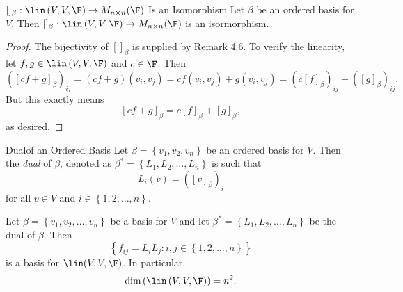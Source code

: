 \documentclass[math_245.tex]{subfiles}
\begin{document}
    \begin{theorem}{$[]_\beta:\lin\left( V,V,\F \right)\to M_{n\times n}(\F)$ Is an Isomorphism}
        Let $\beta$ be an ordered basis for $V$. Then $[]_\beta:\lin\left( V,V,\F \right)\to M_{n\times n}(\F)$ is an isormorphism.
    \end{theorem}

    \begin{proof}
        The bijectivity of $[]_\beta$ is supplied by Remark 4.6. To verify the linearity, let $f,g\in\lin\left( V,V,\F \right)$ and $c\in\F$. Then
        \begin{equation*}
            \left( \left[ cf+g \right] _\beta \right) _{ij} = \left( cf+g \right) \left( v_i,v_j \right) = cf\left( v_i,v_j \right) + g\left( v_i,v_j \right) = \left( c\left[ f \right]_\beta  \right)_{ij} + \left( \left[ g \right]_\beta  \right) _{ij}.
        \end{equation*}
        But this exactly means
        \begin{equation*}
            \left[ cf+g \right] _\beta = c\left[ f \right] _\beta + \left[ g \right] _\beta,
        \end{equation*}
        as desired.
    \end{proof}

    \begin{recall}{Dual}{of an Ordered Basis}
        Let $\beta = \left\lbrace v_1,v_2,v_n \right\rbrace $ be an ordered basis for $V$. Then the \emph{dual} of $\beta$, denoted as $\beta^* = \left\lbrace L_1,L_2,\ldots,L_n \right\rbrace $ is such that
        \begin{equation*}
            L_i\left( v \right) = \left( \left[ v \right] _\beta \right) _i
        \end{equation*}
        for all $v\in V$ and $i\in\left\lbrace 1,2,\ldots,n \right\rbrace$.
    \end{recall}

    \begin{cor}{}
        Let $\beta = \left\lbrace v_1,v_2,\ldots,v_n \right\rbrace$ be a basis for $V$ and let $\beta^* = \left\lbrace L_1,L_2,\ldots,L_n \right\rbrace $ be the dual of $\beta$. Then
        \begin{equation*}
            \left\lbrace f_{ij} = L_iL_j: i,j\in\left\lbrace 1,2,\ldots,n \right\rbrace  \right\rbrace 
        \end{equation*}
        is a basis for $\lin(V,V,\F)$. In particular,
        \begin{equation*}
            \dim\left( \lin\left( V,V,\F \right)  \right) = n^2.
        \end{equation*}
    \end{cor}	
\end{document}
